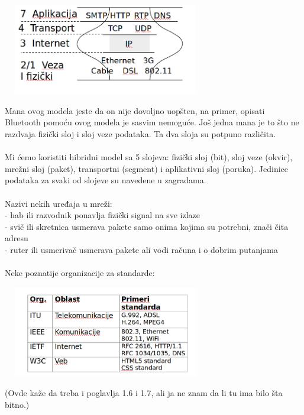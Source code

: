 \documentclass{article} %
\begin{document}
\begin{center}
\includegraphics[width=9cm, height=4cm]{InternetRefModel}\\
\end{center}

Mana ovog modela jeste da on nije dovoljno uopšten, na primer, opisati Bluetooth pomoću ovog modela je sasvim nemoguće. Još jedna mana je to što ne razdvaja fizički sloj i sloj veze podataka. Ta dva sloja su potpuno različita. \\
\\

Mi ćemo koristiti hibridni model sa 5 slojeva: fizički sloj (bit), sloj veze (okvir), mrežni sloj (paket), transportni (segment) i aplikativni sloj (poruka). Jedinice podataka za svaki od slojeve su navedene u zagradama.\\
\\
Nazivi nekih uređaja u mreži: \\
- hab ili razvodnik ponavlja fizički signal na sve izlaze\\
- svič ili skretnica usmerava pakete samo onima kojima su potrebni, znači čita adresu\\
- ruter ili usmerivač usmerava pakete ali vodi računa i o dobrim putanjama\\\\

Neke poznatije organizacije za standarde:\\

\begin{center}
\includegraphics[width=9cm, height=4cm]{organizacije}\\
\end{center}
(Ovde kaže da treba i poglavlja 1.6 i 1.7, ali ja ne znam da li tu ima bilo šta bitno.)
\end{document}
